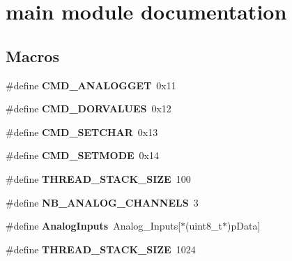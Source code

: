 \hypertarget{group__main__module}{}\section{main module documentation}
\label{group__main__module}
\subsection*{Macros}
\begin{DoxyCompactItemize}
\item 
\hypertarget{group__main__module_ga1bff611f282cc4bb4af703d51a2f647b}{}\#define {\bfseries C\+M\+D\+\_\+\+A\+N\+A\+L\+O\+G\+G\+E\+T}~0x11\label{group__main__module_ga1bff611f282cc4bb4af703d51a2f647b}

\item 
\hypertarget{group__main__module_ga3976a059911d8e824b239b942bdd22b3}{}\#define {\bfseries C\+M\+D\+\_\+\+D\+O\+R\+V\+A\+L\+U\+E\+S}~0x12\label{group__main__module_ga3976a059911d8e824b239b942bdd22b3}

\item 
\hypertarget{group__main__module_gafda68f85307e6882fef66b56a3cf9fa6}{}\#define {\bfseries C\+M\+D\+\_\+\+S\+E\+T\+C\+H\+A\+R}~0x13\label{group__main__module_gafda68f85307e6882fef66b56a3cf9fa6}

\item 
\hypertarget{group__main__module_ga90f87ae623514c4413d9bed1bc70708e}{}\#define {\bfseries C\+M\+D\+\_\+\+S\+E\+T\+M\+O\+D\+E}~0x14\label{group__main__module_ga90f87ae623514c4413d9bed1bc70708e}

\item 
\hypertarget{group__main__module_ga90b7a8cb7bc3fdbd98014a3e15ee6e9a}{}\#define {\bfseries T\+H\+R\+E\+A\+D\+\_\+\+S\+T\+A\+C\+K\+\_\+\+S\+I\+Z\+E}~100\label{group__main__module_ga90b7a8cb7bc3fdbd98014a3e15ee6e9a}

\item 
\hypertarget{group__main__module_ga300da08cc989dc0963caf3a5afc024b8}{}\#define {\bfseries N\+B\+\_\+\+A\+N\+A\+L\+O\+G\+\_\+\+C\+H\+A\+N\+N\+E\+L\+S}~3\label{group__main__module_ga300da08cc989dc0963caf3a5afc024b8}

\item 
\hypertarget{group__main__module_ga70a7dd109f59279a7520024b17e776d5}{}\#define {\bfseries Analog\+Inputs}~Analog\+\_\+\+Inputs\mbox{[}$\ast$(uint8\+\_\+t$\ast$)p\+Data\mbox{]}\label{group__main__module_ga70a7dd109f59279a7520024b17e776d5}

\item 
\hypertarget{group__main__module_ga90b7a8cb7bc3fdbd98014a3e15ee6e9a}{}\#define {\bfseries T\+H\+R\+E\+A\+D\+\_\+\+S\+T\+A\+C\+K\+\_\+\+S\+I\+Z\+E}~1024\label{group__main__module_ga90b7a8cb7bc3fdbd98014a3e15ee6e9a}

\end{DoxyCompactItemize}
